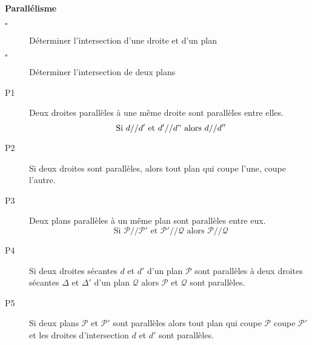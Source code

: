 \begin{titre}

\end{titre}


\begin{CpsCol}
\textbf{Parallélisme}
\begin{description}
\item[$\square$] Déterminer l'intersection d'une droite et d'un plan
\item[$\square$] Déterminer l'intersection de deux plans
\end{description}
\end{CpsCol}


\begin{Reg}
\begin{description}
\item[P1] Deux droites parallèles à une même droite sont parallèles entre elles.
	$$ \text{ Si } d// d' \text{ et } d'// d" \text{ alors } d// d''$$
\item[P2]   Si deux droites sont parallèles, alors tout plan qui coupe l'une, coupe l'autre.
\end{description}
\end{Reg}


\begin{Reg}
\begin{description}
\item[P3]   Deux plans parallèles à un même plan sont parallèles entre eux.
	$$\text{ Si } \mathscr{P} // \mathscr{P}' \text{ et }  \mathscr{P}'// \mathscr{Q} \text{ alors } \mathscr{P} //\mathscr{Q}$$

\item[P4]  Si deux droites sécantes $d$ et $d'$ d'un plan $\mathscr{P}$   sont parallèles à deux droites sécantes $\Delta$ et $\Delta '$ d'un plan $\mathscr{Q}$ alors $\mathscr{P}$  et $\mathscr{Q}$ sont parallèles.



\item[P5]  Si deux plans $\mathscr{P}$  et $\mathscr{P}'$ sont parallèles alors tout plan qui coupe $\mathscr{P}$  coupe $\mathscr{P'}$ et les droites d'intersection $d$ et $d'$ sont parallèles.

\end{description}
\end{Reg}


